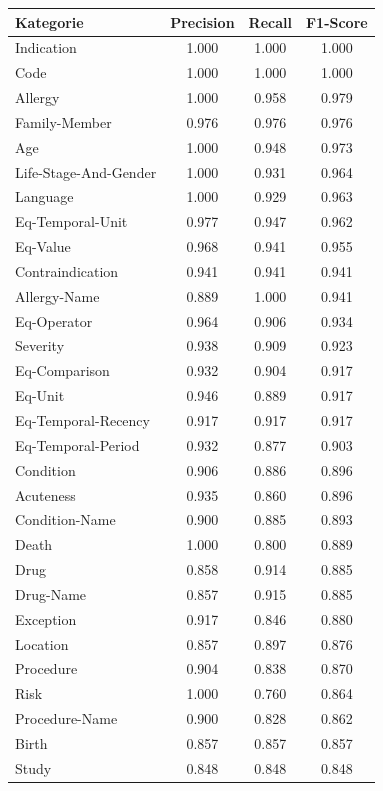 \begin{table}[htbp]
\centering
\begin{tabular}{p{5cm}ccc}
\toprule
\textbf{Kategorie} & \textbf{Precision} & \textbf{Recall} & \textbf{F1-Score} \\
\midrule
Indication & 1.000 & 1.000 & 1.000 \\
Code & 1.000 & 1.000 & 1.000 \\
Allergy & 1.000 & 0.958 & 0.979 \\
Family-Member & 0.976 & 0.976 & 0.976 \\
Age & 1.000 & 0.948 & 0.973 \\
Life-Stage-And-Gender & 1.000 & 0.931 & 0.964 \\
Language & 1.000 & 0.929 & 0.963 \\
Eq-Temporal-Unit & 0.977 & 0.947 & 0.962 \\
Eq-Value & 0.968 & 0.941 & 0.955 \\
Contraindication & 0.941 & 0.941 & 0.941 \\
Allergy-Name & 0.889 & 1.000 & 0.941 \\
Eq-Operator & 0.964 & 0.906 & 0.934 \\
Severity & 0.938 & 0.909 & 0.923 \\
Eq-Comparison & 0.932 & 0.904 & 0.917 \\
Eq-Unit & 0.946 & 0.889 & 0.917 \\
Eq-Temporal-Recency & 0.917 & 0.917 & 0.917 \\
Eq-Temporal-Period & 0.932 & 0.877 & 0.903 \\
Condition & 0.906 & 0.886 & 0.896 \\
Acuteness & 0.935 & 0.860 & 0.896 \\
Condition-Name & 0.900 & 0.885 & 0.893 \\
Death & 1.000 & 0.800 & 0.889 \\
Drug & 0.858 & 0.914 & 0.885 \\
Drug-Name & 0.857 & 0.915 & 0.885 \\
Exception & 0.917 & 0.846 & 0.880 \\
Location & 0.857 & 0.897 & 0.876 \\
Procedure & 0.904 & 0.838 & 0.870 \\
Risk & 1.000 & 0.760 & 0.864 \\
Procedure-Name & 0.900 & 0.828 & 0.862 \\
Birth & 0.857 & 0.857 & 0.857 \\
Study & 0.848 & 0.848 & 0.848 \\

\end{tabular}
\end{table}
